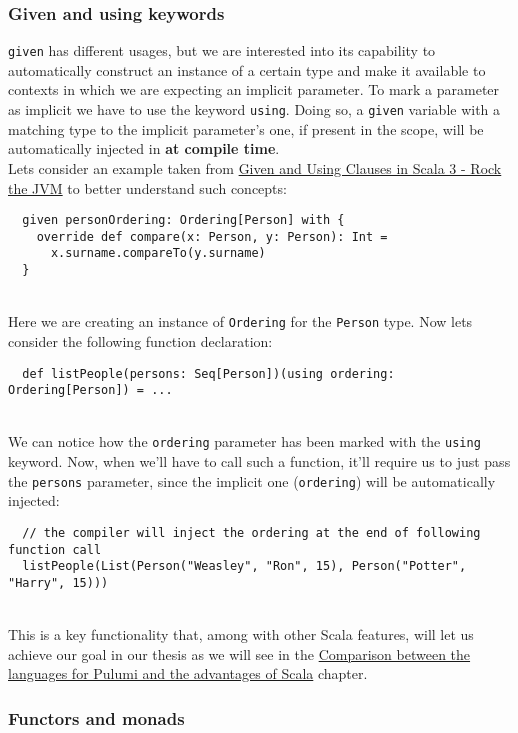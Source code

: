 \subsubsection{Given and using keywords}
\label{par:given-using}
\texttt{given} has different usages, but we are interested into its capability to automatically construct an instance of a certain type and make it available to contexts in which we are expecting an implicit parameter.
To mark a parameter as implicit we have to use the keyword \texttt{using}.
Doing so, a \texttt{given} variable with a matching type to the implicit parameter's one, if present in the scope, will be automatically injected in \textbf{at compile time}.\\
Lets consider an example taken from \href{https://blog.rockthejvm.com/scala-3-given-using/}{Given and Using Clauses in Scala 3 - Rock the JVM} to better understand such concepts:
\begin{verbatim}
  given personOrdering: Ordering[Person] with {
    override def compare(x: Person, y: Person): Int = 
      x.surname.compareTo(y.surname)
  }
\end{verbatim}\mbox{}\\
Here we are creating an instance of \texttt{Ordering} for the \texttt{Person} type.
Now lets consider the following function declaration:
\begin{verbatim}
  def listPeople(persons: Seq[Person])(using ordering: Ordering[Person]) = ...
\end{verbatim}\mbox{}\\
We can notice how the \texttt{ordering} parameter has been marked with the \texttt{using} keyword.
Now, when we'll have to call such a function, it'll require us to just pass the \texttt{persons} parameter, since the implicit one (\texttt{ordering}) will be automatically injected:
\begin{verbatim}
  // the compiler will inject the ordering at the end of following function call
  listPeople(List(Person("Weasley", "Ron", 15), Person("Potter", "Harry", 15)))
\end{verbatim}\mbox{}\\
This is a key functionality that, among with other Scala features, will let us achieve our goal in our thesis as we will see in the \hyperref[cap:comparisons]{Comparison between the languages for Pulumi and the advantages of Scala} chapter.




\subsubsection{Functors and monads}
\label{sssec:functors-monads}

